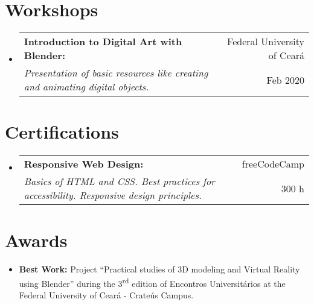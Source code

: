 \documentclass[letterpaper,11pt]{article}
\makeatletter
\newcommand{\resumeItem}[2]{
    \item \small{\textbf{#1}{ #2 \vspace{-2pt}}}
}
\newcommand{\resumeWorkshops}[4]{
    \vspace{-1pt}\item
        \begin{tabular*}{0.97\textwidth}{l@{\extracolsep{\fill}}r}
            \textbf{\small#1} & #2 \\
            \textit{\small#3} & \small #4 \\
        \end{tabular*}\vspace{-5pt}
    \vspace{0.3cm}
}
\newcommand{\resumeCertifications}[4]{
    \vspace{-1pt}\item
        \begin{tabular*}{0.97\textwidth}{l@{\extracolsep{\fill}}r}
            \textbf{\small#1} & #2 \\
            \textit{\small#3} & \small #4 \\
        \end{tabular*}\vspace{-5pt}
    \vspace{0.3cm}
}
\newcommand{\resumeSubItem}[2]{\resumeItem{#1}{#2}\vspace{-4pt}}
\newcommand{\resumeSubHeadingListStart}{\begin{itemize}[leftmargin=*]}
\newcommand{\resumeSubHeadingListEnd}{\end{itemize}}
\makeatother
\begin{document}
\section{\faUsers \hspace{0.2cm} \Large Workshops}

    \resumeSubHeadingListStart
        \resumeWorkshops
            {Introduction to Digital Art with Blender:}{\faMapMarker \hspace{0.1cm} Federal University of Ceará}
            {Presentation of basic resources like creating and animating digital objects.}{\faCalendar \hspace{0.1cm} Feb 2020}
            
            \vspace{0.05cm} %
    \resumeSubHeadingListEnd
    
\section{\faCertificate \hspace{0.2cm} \Large Certifications}

    \resumeSubHeadingListStart
        \resumeCertifications
            {Responsive Web Design:}{{\small \faInstitution} \hspace{0.01cm} freeCodeCamp}
            {Basics of HTML and CSS. Best practices for accessibility. Responsive design principles. \href{https://www.freecodecamp.org/certification/danielbrito/responsive-web-design}{\scriptsize \faExternalLink}}{\faClockO \hspace{0.1cm} 300 h}
            
            \vspace{0.05cm} %
    \resumeSubHeadingListEnd

\section{\faTrophy \hspace{0.2cm} \Large Awards}
    \resumeSubHeadingListStart
        \resumeSubItem{Best Work:}
        {Project ``Practical studies of 3D modeling and Virtual Reality using Blender'' during the 3\textsuperscript{rd} edition of Encontros Universitários at the Federal University of Ceará - Crateús Campus.}
        
        \vspace{0.5cm}
    \resumeSubHeadingListEnd
\end{document}
